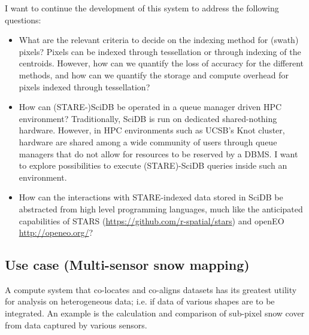 \documentclass[a4paper,10pt]{article}
\begin{document}
I want to continue the development of this system to address the following questions:
\begin{itemize}
 \item What are the relevant criteria to decide on the indexing method for (swath) pixels? Pixels can be indexed through tessellation or through indexing of the centroids. However, how can we quantify the loss of accuracy for the different methods, and how can we quantify the storage and compute overhead for pixels indexed through tessellation? 
 \item How can (\gls{STARE}-)SciDB be operated in a queue manager driven \gls{HPC} environment? Traditionally, SciDB is run on dedicated shared-nothing hardware. However, in \gls{HPC} environments such as UCSB's Knot cluster, hardware are shared among a wide community of users through queue managers that do not allow for resources to be reserved by a DBMS. I want to explore possibilities to execute (\gls{STARE})-SciDB queries inside such an environment.
 \item How can the interactions with \gls{STARE}-indexed data stored in SciDB be abstracted from high level programming languages, much like the anticipated capabilities of STARS (\url{https://github.com/r-spatial/stars}) and openEO \url{http://openeo.org/}?
\end{itemize}


\newpage

\subsection{Use case (Multi-sensor snow mapping)}
A compute system that co-locates and co-aligns datasets has its greatest utility for
analysis on heterogeneous data; i.e. if data of various shapes are to be integrated. An example is the calculation and comparison of sub-pixel snow cover from data captured by various sensors.
\end{document}
